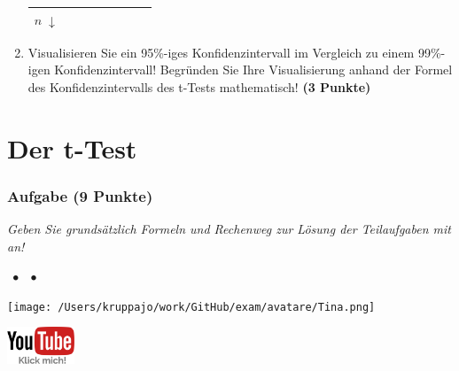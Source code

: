 \documentclass[a4paper, 9pt]{scrartcl}\usepackage[]{graphicx}\usepackage[]{xcolor}
\begin{document}
\begin{enumerate}
\begin{center}
\begin{tabular}[c]{l|c|c|c|l|c|c|c}
{                                                          $n\; \downarrow$} &
                                                                          \hspace{1.8cm}
                                                & \hspace{1.8cm}  & \hspace{1.8cm}\strut\\
    \hline
  \end{tabular}
\end{center}
\item Visualisieren Sie ein 95\%-iges Konfidenzintervall im Vergleich zu einem 99\%-igen Konfidenzintervall! Begründen Sie Ihre Visualisierung anhand der Formel des Konfidenzintervalls des t-Tests mathematisch! \textbf{(3 Punkte)} 
\end{enumerate} 
\clearpage
\part{Der t-Test}

\section{Aufgabe \hfill (9 Punkte)}

\textit{Geben Sie grundsätzlich Formeln und Rechenweg zur Lösung der Teilaufgaben mit an!} \\[1Ex]
 

 
\ifcollection
\begin{flushright}
\tiny\vspace{-3Ex}
\textbf{\examinhaltstart}
\exammodulemathstat $\;\bullet$
\exammodulestat $\;\bullet$
\exammodulestatbbv 
\vspace{-4Ex}
\end{flushright}
\begin{minipage}[t]{0.5\textwidth}
\texttt{[image: /Users/kruppajo/work/GitHub/exam/avatare/Tina.png]}
\end{minipage}
\begin{minipage}[t]{0.5\textwidth}
\hfill
\href{https://youtu.be/zgpw9GC0plk}{\includegraphics[width = 2cm]{img/youtube}}
\end{minipage}
\vspace{-3ex}
\fi
\end{document}
